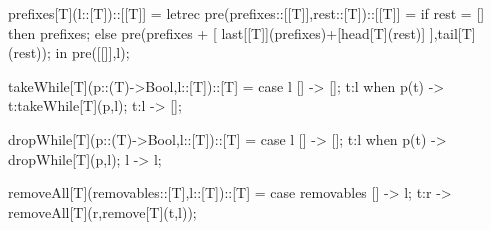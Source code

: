 \documentclass[5p,times]{elsarticle}
\begin{document}
\begin{FigESL}
prefixes[T](l::[T])::[[T]] =
  letrec pre(prefixes::[[T]],rest::[T])::[[T]] = 
    if rest = []
    then prefixes;
    else pre(prefixes + [ 
           last[[T]](prefixes)+[head[T](rest)] 
         ],tail[T](rest));
  in pre([[]],l);

takeWhile[T](p::(T)->Bool,l::[T])::[T] =
  case l {
    [] -> [];
    t:l when p(t) -> t:takeWhile[T](p,l);
    t:l -> [];
  }

dropWhile[T](p::(T)->Bool,l::[T])::[T] =
  case l {
    [] -> [];
    t:l when p(t) -> dropWhile[T](p,l);
    l -> l;
  } 
  
removeAll[T](removables::[T],l::[T])::[T] =
  case removables {
    [] -> l;
    t:r -> removeAll[T](r,remove[T](t,l));
  }
\end{FigESL}
\end{document}
